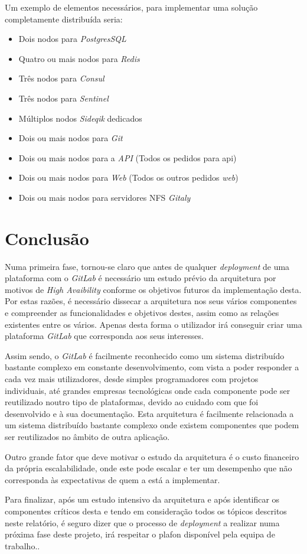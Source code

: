 \documentclass[12pt,a4paper]{article}
\begin{document}
Um exemplo de elementos necessários, para implementar uma solução completamente distribuída seria:

\begin{itemize}
    \item Dois nodos para \emph{PostgresSQL}
    \item Quatro ou mais nodos para \emph{Redis}
    \item Três nodos para \emph{Consul}
    \item Três nodos para \emph{Sentinel}
    \item Múltiplos nodos \emph{Sideqik} dedicados
    \item Dois ou mais nodos para \emph{Git}
    \item Dois ou mais nodos para a \emph{API} (Todos os pedidos para api)
    \item Dois ou mais nodos para \emph{Web} (Todos os outros pedidos \emph{web})
    \item Dois ou mais nodos para servidores NFS \emph{Gitaly}
\end{itemize}

\newpage
\section{Conclusão}
\par Numa primeira fase, tornou-se claro que antes de qualquer \emph{deployment} de uma plataforma com o \emph{GitLab} é necessário um estudo prévio da arquitetura por motivos de \emph{High Avaibility} conforme os objetivos futuros da implementação desta. Por estas razões, é necessário dissecar a arquitetura nos seus vários componentes e compreender as funcionalidades e objetivos destes, assim como as relações existentes entre os vários. Apenas desta forma o utilizador irá conseguir criar uma plataforma \emph{GitLab} que corresponda aos seus interesses. 
\par
Assim sendo, o \emph{GitLab} é facilmente reconhecido como um sistema distribuído bastante complexo em constante desenvolvimento, com vista a poder responder a cada vez mais utilizadores, desde simples programadores com projetos individuais, até grandes empresas tecnológicas onde cada componente pode ser reutilizado noutro tipo de plataformas, devido ao cuidado com que foi desenvolvido e à sua documentação.
Esta arquitetura é facilmente relacionada a um sistema distribuído bastante complexo onde existem componentes que podem ser reutilizados no âmbito de outra aplicação.
\par Outro grande fator que deve motivar o estudo da arquitetura é o custo financeiro da própria escalabilidade, onde este pode escalar e ter um desempenho que não corresponda às expectativas de quem a está a implementar.
\par Para finalizar, após um estudo intensivo da arquitetura e após identificar os componentes críticos desta e tendo em consideração todos os tópicos descritos neste relatório, é seguro dizer que o processo de \emph{deployment} a realizar numa próxima fase deste projeto, irá respeitar o plafon disponível pela equipa de trabalho..
 
\end{document}
